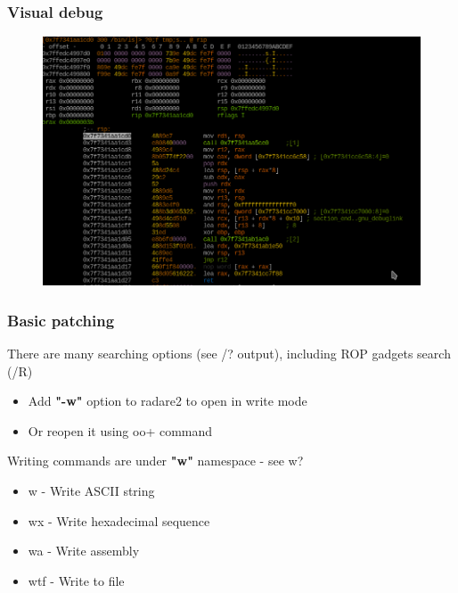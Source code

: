 \documentclass[10pt,pdf,utf8,english,compress,hyperref={unicode}]{beamer}
\begin{document}
\begin{frame}[fragile]
	\frametitle{Visual debug}
	\begin{figure}
		\includegraphics[width=\linewidth]{r2visualdebug.png}
	\end{figure}
\end{frame}

\begin{frame}[fragile]
  \frametitle{Basic patching}
  There are many searching options (see \alert{/?} output),
  including ROP gadgets search (\alert{/R})
  \begin{itemize}
	  \item Add \textbf{"-w"} option to radare2 to open in write mode
	  \item Or reopen it using \alert{oo+} command
  \end{itemize}
  Writing commands are under \textbf{"w"} namespace - see \alert{w?}
  \begin{itemize}
	  \item \alert{w} - Write ASCII string
	  \item \alert{wx} - Write hexadecimal sequence
	  \item \alert{wa} - Write assembly
	  \item \alert{wtf} - Write to file
  \end{itemize}
\end{frame}
\end{document}
